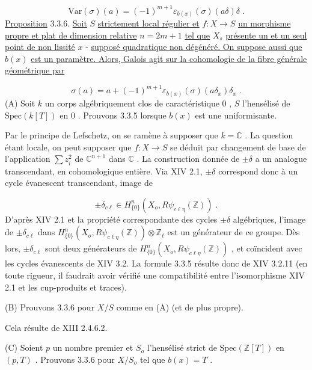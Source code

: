 \begin{equation*}
\mathrm{Var}(\sigma)(a) = (-1)^{m+1} \varepsilon_{b(x)}(\sigma)(a\delta)\delta \;.
\end{equation*}
\underline{Proposition} 3.3.6. \underline{Soit} $S$ \underline{strictement local régulier et} $f : X \to S$ \underline{un morphisme propre et plat de dimension relative} $n = 2m + 1$ \underline{tel que} $X_s$ \underline{présente un et un seul point de non lissité} $x$ - \underline{supposé quadratique non dégénéré. On suppose aussi que} $b(x)$ \underline{est un paramètre. Alors, Galois agit sur la cohomologie de la fibre générale géométrique par}

\begin{equation*}
\sigma(a) = a+(-1)^{m+1} \varepsilon_{b(x)}(\sigma)(a\delta_x)\delta_x \;.
\end{equation*}
(A) Soit $k$ un corps algébriquement clos de caractéristique $0$ , $S$ l'hensélisé
de $\mathrm{Spec}(k[T])$ en $0$ . Prouvons 3.3.5 lorsque $b(x)$ est une uniformisante.

Par le principe de Lefschetz, on se ramène à supposer que $k = \mathbb{C}$ . La question étant locale, on peut supposer que $f : X \to S$ se déduit par changement de base de l'application $\sum z_i^2$ de $\mathbb{C}^{n+1}$ dans $\mathbb{C}$ . La construction donnée de $\pm \delta$ a un analogue transcendant, en cohomologique entière. Via XIV 2.1, $\pm \delta$ correspond donc à un cycle évanescent transcendant, image de

\begin{equation*}
\pm \delta_{c\ell} \in H^{n}_{\{0\}}(X_o,R\psi_{c\ell\eta}(\mathbb{Z})) \;.
\end{equation*}
D'après XIV 2.1 et la propriété correspondante des cycles $\pm \delta$ algébriques, l'image de $\pm \delta_{c\ell}$ dans $H^n_{\{0\}}(X_o,R\psi_{c\ell\eta}(\mathbb{Z})) \otimes \mathbb{Z}_\ell$ est un générateur de ce groupe. Dès lors, $\pm \delta_{c\ell}$ sont deux générateurs de $H^n_{\{0\}}(X_o,R\psi_{c\ell\eta}(\mathbb{Z}))$ , et coïncident avec les cycles évanescents de XIV 3.2. La formule 3.3.5 résulte donc de XIV 3.2.11 (en toute rigueur, il faudrait avoir vérifié une compatibilité entre l'isomorphisme XIV 2.1 et les cup-produits et traces).

(B) Prouvons 3.3.6 pour $X/S$ comme en (A) (et de plus propre).

Cela résulte de XIII 2.4.6.2.

(C) Soient $p$ un nombre premier et $S_o$ l'hensélisé strict de $\mathrm{Spec}(\mathbb{Z}[T])$ en $(p,T)$ . Prouvons 3.3.6 pour $X/S_o$ tel que $b(x) = T$ .

